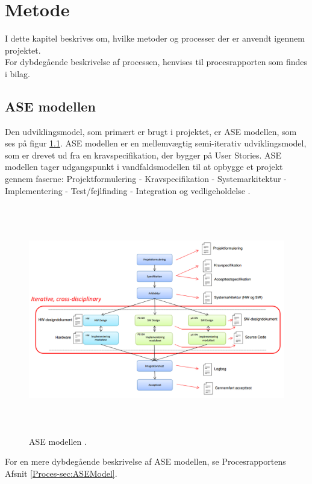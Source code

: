 \chapter{Metode}
I dette kapitel beskrives om, hvilke metoder og processer der er anvendt igennem projektet. \\
For dybdegående beskrivelse af processen, henvises til procesrapporten som findes i bilag.

\section{ASE modellen}
Den udviklingsmodel, som primært er brugt i projektet, er ASE modellen, som ses på figur \ref{fig:ASE}. ASE modellen\cite{ASE} er en mellemvægtig semi-iterativ udviklingsmodel, som er drevet ud fra en kravspecifikation, der bygger på User Stories. ASE modellen tager udgangspunkt i vandfaldsmodellen til at opbygge et projekt gennem faserne: Projektformulering - Kravspecifikation - Systemarkitektur -  Implementering -  Test/fejlfinding -  Integration og vedligeholdelse \cite{ASE}.

\begin{figure} [!ht]
	\begin{center}
		\includegraphics[height=10cm, width=12cm]{Metode/ASEModellen}
	\end{center}
	\caption{ASE modellen \cite{ASE}.}
	\label{fig:ASE}
\end{figure}

For en mere dybdegående beskrivelse af ASE modellen, se Procesrapportens Afsnit \ref{Proces-sec:ASEModel}. \\

